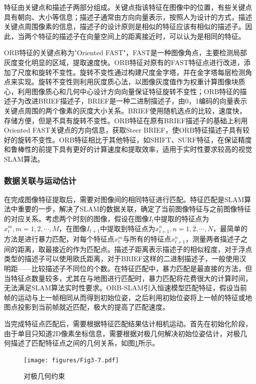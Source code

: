 特征由关键点和描述子两部分组成。关键点指该特征在图像中的位置，有些关键点具有朝向、大小等信息；描述子通常由方向向量表示，按照人为设计的方式，描述关键点周围像素的信息，描述子的设计原则是相似的特征应该有相似的描述子。因此，当两个特征的描述子在向量空间上的距离接近时，可以认为是相同的特征。

ORB特征的关键点称为"Oriented FAST"，FAST是一种图像角点\upcite{[3.10]}，主要检测局部灰度变化明显的区域，提取速度快。ORB特征对原有的FAST特征点进行改进，添加了尺度和旋转不变性。旋转不变性通过构建尺度金字塔，并在金字塔每层检测角点来实现。旋转不变性则利用灰度质心法，以图像灰度值作为权重计算图像块质心，利用图像质心和几何中心设计方向向量保证特征旋转不变性；ORB特征的描述子为改进BRIEF描述子，BRIEF是一种二进制描述子\upcite{[3.11]}，由0，1编码的向量表示关键点周围的两个像素的灰度大小关系。BRIEF使用随机选点的比较，速度快，存储方便，但是不具有旋转不变性。ORB特征在原有BRIEF描述子的基础上利用Oriented FAST关键点的方向信息，获取Steer BRIEF，使ORB特征描述子具有较好的旋转不变性。ORB特征相比于其他特征，如SHIFT、SURF特征，在保证精度和鲁棒性的前提下具有更好的计算速度和提取效率，适用于实时性要求较高的视觉SLAM算法。

\subsubsection{数据关联与运动估计}
在完成图像特征提取后，需要对图像间的相同特征进行匹配。特征匹配是SLAM算法中重要的一步，解决了SLAM的数据关联，确定了当前图像特征与之前图像特征的对应关系。考虑两个时刻的图像，假设在图像$I_t$中提取的特征点为$x_t^m,m=1,2,\cdots,M$，在图像$I_{t+1}$中提取到特征点为$x_{t+1}^n,n=1,2,\cdots,N$，最简单的方法是进行暴力匹配，对每个特征点$x_t^m$与所有的特征点$x_{t+1}^n$，测量两者描述子之间的距离，取最接近的作为匹配点。描述子距离表示描述子的相似程度，对于浮点类型的描述子可以使用欧氏距离，对于BRIEF这样的二进制描述子，一般使用汉明距——比较描述子不同位的个数。在特征匹配中，暴力匹配是最直接的方法，但当特征点数量较多，尤其在与地图进行匹配时，暴力匹配将花费很大的计算时间，无法满足SLAM算法实时性要求。ORB-SLAM引入恒速模型匹配特征，假设当前帧的运动与上一帧相同从而得到初始位姿，之后利用初始位姿将上一帧的特征或地图点投影到当前帧就近匹配，极大的提高了匹配速度。

当完成特征点匹配后，需要根据特征匹配结果估计相机运动。首先在初始化阶段，由于单目只知道2D像素坐标信息，需要根据对极几何解决初始位姿估计，对极几何描述了匹配特征点之间的几何关系，如图\ref{fig3.7}所示。

\begin{figure}[h]
\centering
\texttt{[image: figures/Fig3-7.pdf]}
\caption{对极几何约束}
\label{fig3.7}
\end{figure}
\vspace{-20pt}

